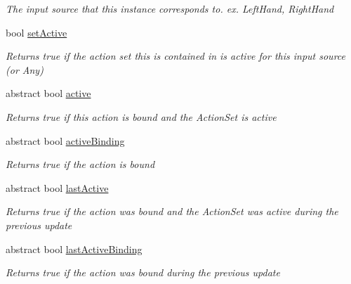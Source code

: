 \begin{DoxyCompactItemize}
\begin{DoxyCompactList}\small\item\em The input source that this instance corresponds to. ex. Left\+Hand, Right\+Hand \end{DoxyCompactList}\item 
bool \mbox{\hyperlink{class_valve_1_1_v_r_1_1_steam_v_r___action___source_aafaed73b850687ab90ecbb2398df57e2}{set\+Active}}
\begin{DoxyCompactList}\small\item\em Returns true if the action set this is contained in is active for this input source (or Any) \end{DoxyCompactList}\item 
abstract bool \mbox{\hyperlink{class_valve_1_1_v_r_1_1_steam_v_r___action___source_ade25c2814f3dc4b59888e8dc2a36cf3c}{active}}
\begin{DoxyCompactList}\small\item\em Returns true if this action is bound and the Action\+Set is active \end{DoxyCompactList}\item 
abstract bool \mbox{\hyperlink{class_valve_1_1_v_r_1_1_steam_v_r___action___source_a170594d0fcc97fba3bf7545851d63c11}{active\+Binding}}
\begin{DoxyCompactList}\small\item\em Returns true if the action is bound \end{DoxyCompactList}\item 
abstract bool \mbox{\hyperlink{class_valve_1_1_v_r_1_1_steam_v_r___action___source_abcc77ca7d5edf240c2d517c84fc7e828}{last\+Active}}
\begin{DoxyCompactList}\small\item\em Returns true if the action was bound and the Action\+Set was active during the previous update \end{DoxyCompactList}\item 
abstract bool \mbox{\hyperlink{class_valve_1_1_v_r_1_1_steam_v_r___action___source_a16bf2a670aa67fad39e7b5bb17664926}{last\+Active\+Binding}}
\begin{DoxyCompactList}\small\item\em Returns true if the action was bound during the previous update \end{DoxyCompactList}\end{DoxyCompactItemize}


